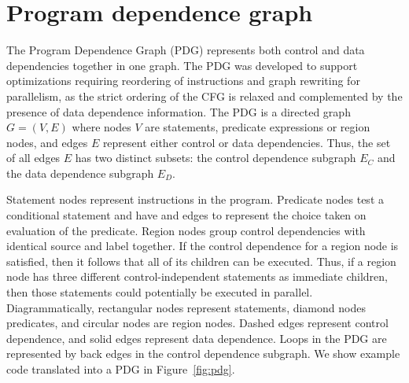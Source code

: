 \section{Program dependence graph}
\label{section:vsdg:pdg}
The Program Dependence Graph (PDG) represents both control and data dependencies together in one graph. 
The PDG was developed to support optimizations requiring reordering of instructions and graph rewriting for parallelism, as the strict ordering of the CFG is relaxed and complemented by the presence of data dependence information. 
The PDG is a directed graph $G=(V,E)$ where nodes $V$ are statements, predicate expressions or region nodes, and edges $E$ represent either control or data dependencies. 
Thus, the set of all edges $E$ has two distinct subsets: 
the control dependence subgraph $E_{C}$ and the data dependence subgraph $E_{D}$.

Statement nodes represent instructions in the program. 
Predicate nodes test a conditional statement and have \true and \false edges to represent the choice taken on evaluation of the predicate. 
Region nodes group control dependencies with identical source and label together. 
If the control dependence for a region node is satisfied, then it follows that all of its children can be executed. 
Thus, if a region node has three different control-independent statements as immediate children, then those statements could potentially be executed in parallel. 
Diagrammatically, rectangular nodes represent statements, diamond nodes predicates, and circular nodes are region nodes. 
Dashed edges represent control dependence, and solid edges represent data dependence. 
Loops in the PDG are represented by back edges in the control dependence subgraph. 
We show example code translated into a PDG in Figure~\ref{fig:pdg}.

